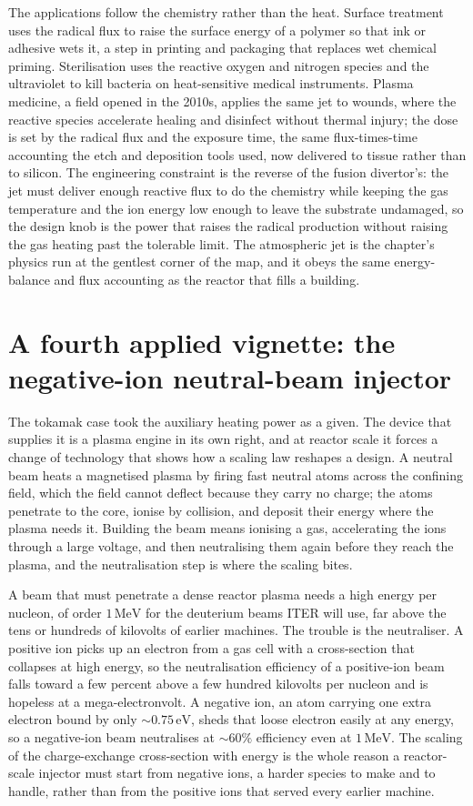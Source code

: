 The applications follow the chemistry rather than the heat. Surface treatment
uses the radical flux to raise the surface energy of a polymer so that ink or
adhesive wets it, a step in printing and packaging that replaces wet chemical
priming. Sterilisation uses the reactive oxygen and nitrogen species and the
ultraviolet to kill bacteria on heat-sensitive medical instruments. Plasma
medicine, a field opened in the 2010s, applies the same jet to wounds, where the
reactive species accelerate healing and disinfect without thermal injury; the
dose is set by the radical flux and the exposure time, the same flux-times-time
accounting the etch and deposition tools used, now delivered to tissue rather
than to silicon. The engineering constraint is the reverse of the fusion
divertor's: the jet must deliver enough reactive flux to do the chemistry while
keeping the gas temperature and the ion energy low enough to leave the substrate
undamaged, so the design knob is the power that raises the radical production
without raising the gas heating past the tolerable limit. The atmospheric jet is
the chapter's physics run at the gentlest corner of the map, and it obeys the
same energy-balance and flux accounting as the reactor that fills a building.

\section{A fourth applied vignette: the negative-ion neutral-beam injector}

The tokamak case took the auxiliary heating power as a given. The device that
supplies it is a plasma engine in its own right, and at reactor scale it forces
a change of technology that shows how a scaling law reshapes a design. A neutral
beam heats a magnetised plasma by firing fast neutral atoms across the confining
field, which the field cannot deflect because they carry no charge; the atoms
penetrate to the core, ionise by collision, and deposit their energy where the
plasma needs it. Building the beam means ionising a gas, accelerating the ions
through a large voltage, and then neutralising them again before they reach the
plasma, and the neutralisation step is where the scaling bites.

A beam that must penetrate a dense reactor plasma needs a high energy per
nucleon, of order $1\,\si{\mega\electronvolt}$ for the deuterium beams ITER will
use, far above the tens or hundreds of kilovolts of earlier machines. The
trouble is the neutraliser. A positive ion picks up an electron from a gas cell
with a cross-section that collapses at high energy, so the neutralisation
efficiency of a positive-ion beam falls toward a few percent above a few hundred
kilovolts per nucleon and is hopeless at a mega-electronvolt. A negative ion, an
atom carrying one extra electron bound by only $\sim 0.75\,\si{\electronvolt}$,
sheds that loose electron easily at any energy, so a negative-ion beam
neutralises at $\sim 60\%$ efficiency even at $1\,\si{\mega\electronvolt}$. The
scaling of the charge-exchange cross-section with energy is the whole reason a
reactor-scale injector must start from negative ions, a harder species to make
and to handle, rather than from the positive ions that served every earlier
machine.

